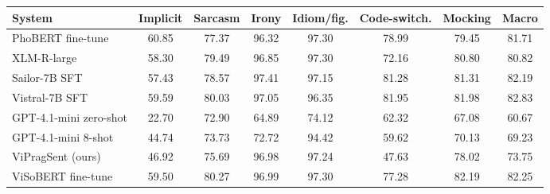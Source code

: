 \small
\setlength{\tabcolsep}{3pt}
\begin{tabular}{lccccccc}
\toprule
System & Implicit & Sarcasm & Irony & Idiom/fig. & Code-switch. & Mocking & Macro \\
\midrule
PhoBERT fine-tune & 60.85 & 77.37 & 96.32 & 97.30 & 78.99 & 79.45 & 81.71 \\
XLM-R-large & 58.30 & 79.49 & 96.85 & 97.30 & 72.16 & 80.80 & 80.82 \\
Sailor-7B SFT & 57.43 & 78.57 & 97.41 & 97.15 & 81.28 & 81.31 & 82.19 \\
Vistral-7B SFT & 59.59 & 80.03 & 97.05 & 96.35 & 81.95 & 81.98 & 82.83 \\
GPT-4.1-mini zero-shot & 22.70 & 72.90 & 64.89 & 74.12 & 62.32 & 67.08 & 60.67 \\
GPT-4.1-mini 8-shot & 44.74 & 73.73 & 72.72 & 94.42 & 59.62 & 70.13 & 69.23 \\
ViPragSent (ours) & 46.92 & 75.69 & 96.98 & 97.24 & 47.63 & 78.02 & 73.75 \\
ViSoBERT fine-tune & 59.50 & 80.27 & 96.99 & 97.30 & 77.28 & 82.19 & 82.25 \\
\bottomrule
\end{tabular}%

